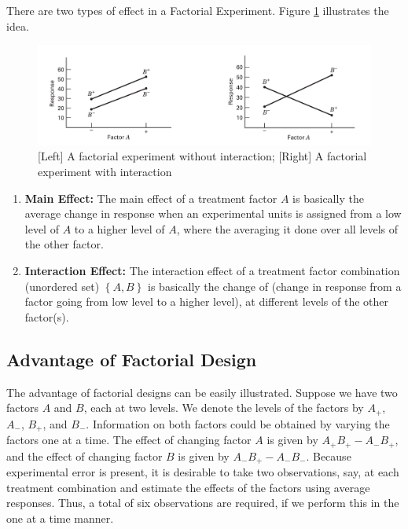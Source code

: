 \documentclass[12pt]{article}
\theoremstyle{definition}
\begin{document}
There are two types of effect in a Factorial Experiment. Figure \ref{fig:interaction-factorial} illustrates the idea.

\begin{figure}[h]
    \centering
    \includegraphics[width = \textwidth]{interaction-factorial.png}
    \caption{[Left] A factorial experiment without interaction; [Right] A factorial experiment with interaction}
    \label{fig:interaction-factorial}
\end{figure}

\begin{enumerate}
    \item \textbf{Main Effect:} The main effect of a treatment factor $A$ is basically the average change in response when an experimental units is assigned from a low level of $A$ to a higher level of $A$, where the averaging it done over all levels of the other factor.
    \item \textbf{Interaction Effect:} The interaction effect of a treatment factor combination (unordered set) $\left\{A, B\right\}$ is basically the change of (change in response from a factor going from low level to a higher level), at different levels of the other factor(s). 
\end{enumerate}


\subsection{Advantage of Factorial Design}

The advantage of factorial designs can be easily illustrated. Suppose we have two factors $A$ and $B$, each at two levels. We denote the levels of the factors by $A_{+}$, $A_{-}$, $B_{+}$, and $B_{-}$. Information on both factors could be obtained by varying the factors one at a time. The effect of changing factor $A$ is given by $A_{+}B_{+} - A_{-}B_{+}$, and the effect of changing factor $B$ is given by $A_{-}B_{+} - A_{-}B_{-}$. Because experimental error is present, it is
desirable to take two observations, say, at each treatment combination and estimate the effects of the factors using average responses. Thus, a total of six observations are required, if we perform this in the one at a time manner.
\end{document}
